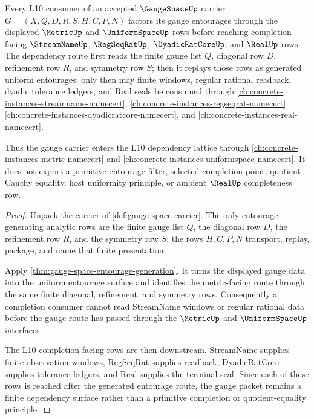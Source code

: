 \begin{theorem}
\label{thm:gauge-space-l10-metric-completion-dependency}
Every L10 consumer of an accepted $\GaugeSpaceUp$ carrier $G=(X,Q,D,R,S,H,C,P,N)$ factors its gauge entourages through the displayed $\MetricUp$ and $\UniformSpaceUp$ rows before reaching completion-facing $\StreamNameUp$, $\RegSeqRatUp$, $\DyadicRatCoreUp$, and $\RealUp$ rows. The dependency route first reads the finite gauge list $Q$, diagonal row $D$, refinement row $R$, and symmetry row $S$; then it replays those rows as generated uniform entourages; only then may finite windows, regular rational readback, dyadic tolerance ledgers, and Real seals be consumed through \autoref{ch:concrete-instances-streamname-namecert}, \autoref{ch:concrete-instances-regseqrat-namecert}, \autoref{ch:concrete-instances-dyadicratcore-namecert}, and \autoref{ch:concrete-instances-real-namecert}.

Thus the gauge carrier enters the L10 dependency lattice through \autoref{ch:concrete-instances-metric-namecert} and \autoref{ch:concrete-instances-uniformspace-namecert}. It does not export a primitive entourage filter, selected completion point, quotient Cauchy equality, host uniformity principle, or ambient $\RealUp$ completeness row.
\end{theorem}
\begin{proof}
Unpack the carrier of \autoref{def:gauge-space-carrier}. The only entourage-generating analytic rows are the finite gauge list $Q$, the diagonal row $D$, the refinement row $R$, and the symmetry row $S$; the rows $H,C,P,N$ transport, replay, package, and name that finite presentation.

Apply \autoref{thm:gauge-space-entourage-generation}. It turns the displayed gauge data into the uniform entourage surface and identifies the metric-facing route through the same finite diagonal, refinement, and symmetry rows. Consequently a completion consumer cannot read StreamName windows or regular rational data before the gauge route has passed through the $\MetricUp$ and $\UniformSpaceUp$ interfaces.

The L10 completion-facing rows are then downstream. StreamName supplies finite observation windows, RegSeqRat supplies readback, DyadicRatCore supplies tolerance ledgers, and Real supplies the terminal seal. Since each of these rows is reached after the generated entourage route, the gauge packet remains a finite dependency surface rather than a primitive completion or quotient-equality principle.
\end{proof}

